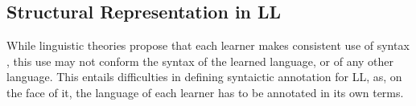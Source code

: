 \documentclass[letter,11pt]{article}
\begin{document}



\subsection{Structural Representation in LL}

While linguistic theories propose that each learner
makes consistent use of syntax \cite{huebner1985system,tarone1983variability},
this use may not conform the syntax of the learned language, or of any other
language. This entails difficulties in defining syntaictic annotation for LL,
as, on the face of it, the language of each learner has to be annotated
in its own terms.
\end{document}
